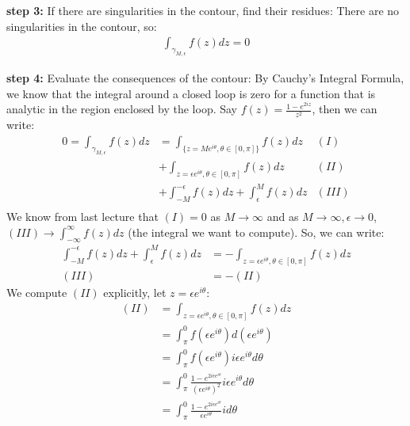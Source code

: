 \begin{example}
    \textbf{step 3:} If there are singularities in the contour, find their residues:
    There are no singularities in the contour, so:
    \begin{align}
        \int_{\gamma_{M,\epsilon}} f(z)dz = 0
    \end{align}

    \textbf{step 4:} Evaluate the consequences of the contour:
    By Cauchy's Integral Formula, we know that the integral around a closed loop is zero for a function that is analytic in the region enclosed by the loop.
    Say $f(z) = \frac{1 - e^{2iz}}{z^2}$, then we can write:
    \begin{align*}
        0 = \int_{\gamma_{M,\epsilon}} f(z)dz & = \int_{\{z=Me^{i\theta}, \theta \in [0, \pi]\}} f(z)dz       & (I)   \\
                                              & + \int_{z = \epsilon e^{i\theta}, \theta \in [0, \pi]} f(z)dz & (II)  \\
                                              & + \int_{-M}^{-\epsilon} f(z)dz + \int_{\epsilon}^{M} f(z)dz   & (III) \\
    \end{align*}
    We know from last lecture that $(I) = 0$ as $M \to \infty$ and as $M \to \infty, \epsilon \to 0$, $(III) \to \int_{-\infty}^{\infty} f(z)dz$ (the integral we want to compute). So, we can write:
    \begin{align*}
        \int_{-M}^{-\epsilon} f(z)dz + \int_{\epsilon}^{M} f(z)dz & = -\int_{z = \epsilon e^{i\theta}, \theta \in [0, \pi]} f(z)dz \\
        (III)                                                     & = -(II)
    \end{align*}
    We compute $(II)$ explicitly, let $z = \epsilon e^{i\theta}$:
    \begin{align*}
        (II) & = \int_{z = \epsilon e^{i\theta}, \theta \in [0, \pi]} f(z)dz                                                \\
             & = \int_{\pi}^{0} f(\epsilon e^{i\theta})d(\epsilon e^{i\theta})                                              \\
             & = \int_{\pi}^{0} f(\epsilon e^{i\theta})i\epsilon e^{i\theta}d\theta                                         \\
             & = \int_{\pi}^{0} \frac{1 - e^{2i\epsilon e^{i\theta}}}{(\epsilon e^{i\theta})^2}i\epsilon e^{i\theta}d\theta \\
             & = \int_{\pi}^{0} \frac{1 - e^{2i\epsilon e^{i\theta}}}{\epsilon e^{i\theta}}id\theta                         \\

\end{align*}
\end{example}
